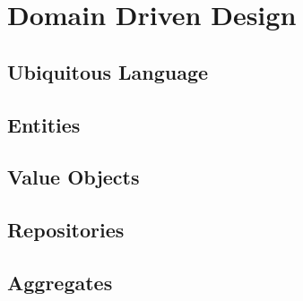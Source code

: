 \chapter{Domain Driven Design}

\section{Ubiquitous Language}

\section{Entities}

\section{Value Objects}

\section{Repositories}

\section{Aggregates}